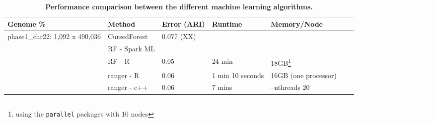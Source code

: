 \documentclass[11pt]{article}
\newcommand{\cursedforest}{{\sc CursedForest}}
\begin{document}
\begin{table}[!ht]
\begin{minipage}{\textwidth}
\centering
\caption{
{\bf Performance comparison between the different machine learning algorithms.}}
\begin{tabular}{|l|l|l|l|l|l|p{1cm}|}
\hline
\bf{Genome \%}                      & \bf{Method} & \bf{Error (ARI)} & \bf{Runtime} & \bf{Memory/Node} \\
\hline

\multirow{3}{*}{phase1\_chr22: 1,092 x 490,036} & \cursedforest\ & 0.077 (XX) &                  &                                                                   \\
                                                & RF - Spark ML  &            &                  &                                                                   \\
                                                & RF - R         & 0.05       & 24 min           & 18GB\footnote{using the \texttt{parallel} packages with 10 nodes} \\
                                                & ranger - R      & 0.06       & 1 min 10 seconds & 16GB  (one processor)                                             \\
                                                & ranger - c++     & 0.06       & 7 mins           & --nthreads 20                                                     \\


\end{tabular}
\end{minipage}
\end{table}
\end{document}
